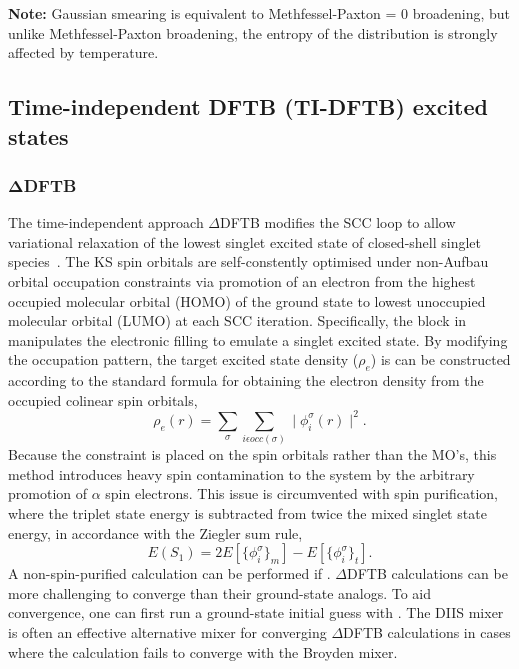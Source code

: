 \textbf{Note:} Gaussian smearing is equivalent to Methfessel-Paxton
 = 0 broadening, but unlike Methfessel-Paxton broadening,
the entropy of the distribution is strongly affected by temperature.

\subsection{Time-independent DFTB (TI-DFTB) excited states}

\subsubsection{$\boldsymbol\Delta$DFTB}
The time-independent approach $\Delta$DFTB modifies the SCC loop to allow
variational relaxation of the lowest singlet excited state of closed-shell
singlet species~\cite{irle-JCTC-12-313}. The KS spin orbitals are self-constently
optimised under non-Aufbau orbital occupation constraints via promotion of an
electron from the highest occupied molecular orbital (HOMO) of the ground state
to lowest unoccupied molecular orbital (LUMO) at each SCC
iteration. Specifically, the  block in \dftbp manipulates the
electronic filling to emulate a singlet excited state. By modifying the
occupation pattern, the target excited state density ($\rho_e$) is can be
constructed according to the standard formula for obtaining the electron density
from the occupied colinear spin orbitals,
\begin{equation*}
  \rho_e(r) = \sum_\sigma \sum_{i \epsilon occ(\sigma)}\mid\phi_i^\sigma(r)\mid^2.
\end{equation*}
Because the constraint is placed on the spin orbitals rather than the MO's, this
method introduces heavy spin contamination to the system by the arbitrary
promotion of $\alpha$ spin electrons.  This issue is circumvented with spin
purification, where the triplet state energy is subtracted from twice the mixed
singlet state energy, in accordance with the Ziegler sum
rule,\cite{baerends-TCA-43-261}
\begin{equation*}
  E(S_1) = 2E[\{\phi_i^\sigma\}_m]-E[\{\phi_i^\sigma\}_t].
\end{equation*}
A non-spin-purified calculation can be performed if .
$\Delta$DFTB calculations can be more challenging to converge than their
ground-state analogs. To aid convergence, one can first run a ground-state
initial guess with .  The DIIS mixer is often an effective
alternative mixer for converging $\Delta$DFTB calculations in cases where the
calculation fails to converge with the Broyden mixer.

